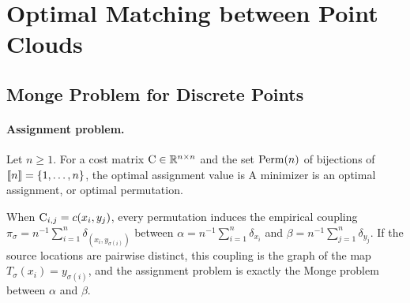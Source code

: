 \section{Optimal Matching between Point Clouds}
\label{sec-matching}
\subsection{Monge Problem for Discrete Points}
\label{sec-monge-pbm}
\paragraph{Assignment problem.}
\begin{defn}\label{def-optimal-assignment}
Let $n\geq1$. For a cost matrix $\mathrm{C}\in\mathbb{R}^{n\times n}$ and the set $\mathrm{Perm}(n)$ of bijections of $\llbracket n\rrbracket=\{1,\ldots,n\}$, the optimal assignment value is
A minimizer is an optimal assignment, or optimal permutation.
\end{defn}
When $\mathrm{C}_{i,j}=c(x_i,y_j)$, every permutation induces the empirical coupling $\pi_\sigma=n^{-1}\sum_{i=1}^n\delta_{(x_i,y_{\sigma(i)})}$ between $\alpha=n^{-1}\sum_{i=1}^n\delta_{x_i}$ and $\beta=n^{-1}\sum_{j=1}^n\delta_{y_j}$. If the source locations are pairwise distinct, this coupling is the graph of the map $T_\sigma(x_i)=y_{\sigma(i)}$, and the assignment problem is exactly the Monge problem between $\alpha$ and $\beta$.

